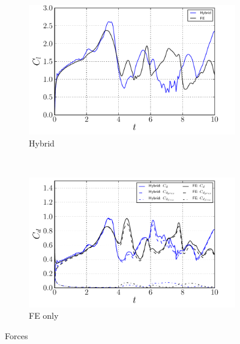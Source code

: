 	\begin{figure}[!p]
     \centering
     \begin{subfigure}[t]{0.49\textwidth}
             \includegraphics[width=\textwidth]{./figures/hybrid/ellipse/hybrid_ellipseForce_CL.pdf}
             \caption{Hybrid}
             \label{fig:hybrid_ellipseForce_CL}
     \end{subfigure}%
     ~ %
     \begin{subfigure}[t]{0.49\textwidth}
             \includegraphics[width=\textwidth]{./figures/hybrid/ellipse/hybrid_ellipseForce_CD.pdf}
             \caption{FE only}
             \label{fig:hybrid_ellipseForce_CD}
     \end{subfigure}
     \caption{Forces}
     \label{fig:hybrid_ellipseForce}
	\end{figure}
	

